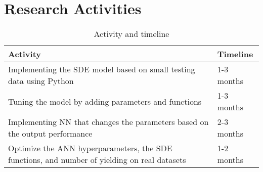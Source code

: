 \section*{Research Activities}
\begin{table}[h!]
\centering
\begin{tabular}{|p{5cm}|p{5cm}|}
\hline
\textbf{Activity} & \textbf{Timeline} \\ \hline
Implementing the SDE model based on small testing data using Python & 1-3 months \\ \hline
Tuning the model by adding parameters and functions & 1-3 months \\ \hline
Implementing NN that changes the parameters based on the output performance & 2-3 months \\ \hline
Optimize the ANN hyperparameters, the SDE functions, and number of yielding on real datasets & 1-2 months \\ \hline
\end{tabular}
\caption{Activity and timeline}
\end{table}
